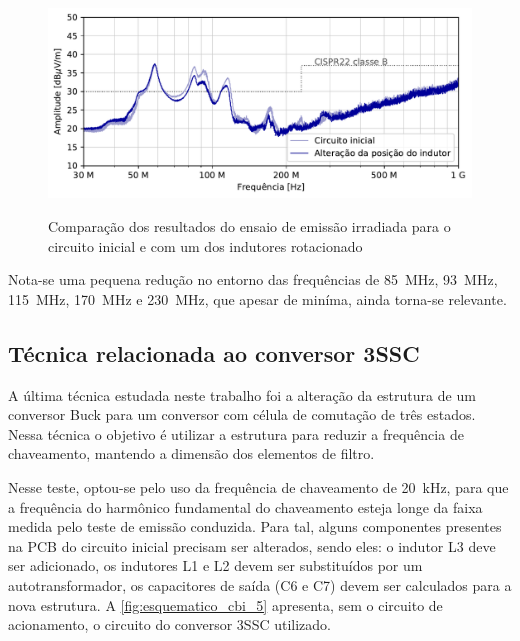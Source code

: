     \begin{figure}[H]
    	\centering
    	\caption{Comparação dos resultados do ensaio de emissão irradiada para o circuito inicial e com um dos indutores rotacionado}
    	\includegraphics[scale=.9]{pdf/rad/Alteração da posição do indutor.pdf}
    	\label{fig:med_rad_indutor}
    \end{figure}
    
    Nota-se uma pequena redução no entorno das frequências de \qty{85}{\mega\hertz}, \qty{93}{\mega\hertz}, \qty{115}{\mega\hertz}, \qty{170}{\mega\hertz} e \qty{230}{\mega\hertz}, que apesar de miníma, ainda torna-se relevante. 
    
    \subsection{Técnica relacionada ao conversor 3SSC} \label{cap:result_tecnicas_3ssc}
    
    A última técnica estudada neste trabalho foi a alteração da estrutura de um conversor Buck \interleaved para um conversor com célula de comutação de três estados. Nessa técnica o objetivo é utilizar a estrutura para reduzir a frequência de chaveamento, mantendo a dimensão dos elementos de filtro. 
    
    Nesse teste, optou-se pelo uso da frequência de chaveamento de \qty{20}{\kilo\hertz}, para que a frequência do harmônico fundamental do chaveamento esteja longe da faixa medida pelo teste de emissão conduzida. Para tal, alguns componentes presentes na PCB do circuito inicial precisam ser alterados, sendo eles: o indutor L3 deve ser adicionado, os indutores L1 e L2 devem ser substituídos por um autotransformador, os capacitores de saída (C6 e C7) devem ser calculados para a nova estrutura. A \autoref{fig:esquematico_cbi_5} apresenta, sem o circuito de acionamento, o circuito do conversor 3SSC utilizado. 
    

